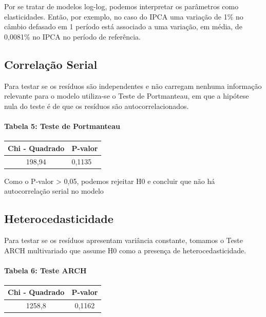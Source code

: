 \documentclass[12pt]{article}
\begin{document}
Por se tratar de modelos log-log, podemos interpretar os parâmetros como
elasticidades. Então, por exemplo, no caso do IPCA uma variação de 1\%
no câmbio defasado em 1 período está associado a uma variação, em média,
de 0,0081\% no IPCA no período de referência.

\hypertarget{correlauxe7uxe3o-serial}{%
\subsection{Correlação Serial}\label{correlauxe7uxe3o-serial}}

Para testar se os resíduos são independentes e não carregam nenhuma
informação relevante para o modelo utiliza-se o Teste de Portmanteau, em
que a hipótese nula do teste é de que os resíduos são
autocorrelacionados.

\hypertarget{tabela-5-teste-de-portmanteau}{%
\paragraph{Tabela 5: Teste de
Portmanteau}\label{tabela-5-teste-de-portmanteau}}

\begin{longtable}[]{@{}cl@{}}
\toprule
Chi - Quadrado & P-valor \\
\midrule
\endhead
198,94 & 0,1135 \\
\bottomrule
\end{longtable}

Como o P-valor \textgreater{} 0,05, podemos rejeitar H0 e concluir que
não há autocorrelação serial no modelo

\hypertarget{heterocedasticidade}{%
\subsection{Heterocedasticidade}\label{heterocedasticidade}}

Para testar se os resíduos apresentam variância constante, tomamos o
Teste ARCH multivariado que assume H0 como a presença de
heterocedasticidade.

\hypertarget{tabela-6-teste-arch}{%
\paragraph{Tabela 6: Teste ARCH}\label{tabela-6-teste-arch}}

\begin{longtable}[]{@{}cc@{}}
\toprule
Chi - Quadrado & P-valor \\
\midrule
\endhead
1258,8 & 0,1162 \\
\bottomrule
\end{longtable}
\end{document}
